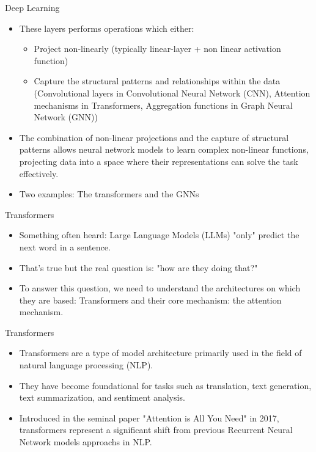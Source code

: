 \begin{frame}{Deep Learning}

  \begin{itemize}
    \item These layers performs operations which either:
    \begin{itemize}
      \item Project non-linearly (typically linear-layer + non linear activation function)
      \item Capture the structural patterns and relationships within the data (Convolutional layers in Convolutional Neural Network (CNN), Attention mechanisms in Transformers, Aggregation functions in Graph Neural Network (GNN))
    \end{itemize}
    \item The combination of non-linear projections and the capture of structural patterns allows neural network models to learn complex non-linear functions, projecting data into a space where their representations can solve the task effectively.
    \item Two examples: The transformers and the GNNs
  \end{itemize}


\end{frame}



\begin{frame}{Transformers}
  \begin{itemize}
      \item Something often heard: Large Language Models (LLMs) "only" predict the next word in a sentence.
      \item That's true but the real question is: "how are they doing that?"
      \item To answer this question, we need to understand the architectures on which they are based: Transformers and their core mechanism: the attention mechanism.
  \end{itemize}
\end{frame}


\begin{frame}{Transformers}
    \begin{itemize}
        \item Transformers are a type of model architecture primarily used in the field of natural language processing (NLP).
        \item They have become foundational for tasks such as translation, text generation, text summarization, and sentiment analysis.
        \item Introduced in the seminal paper "Attention is All You Need" in 2017, transformers represent a significant shift from previous Recurrent Neural Network models approachs in NLP.
      \end{itemize}
\end{frame}

